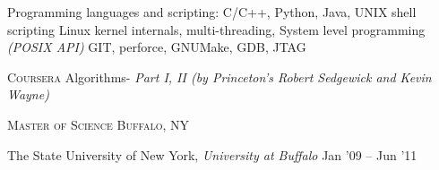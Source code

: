 \documentclass[10pt,a4paper]{article} %
\begin{document}

\inlineheadsection %
{Programming languages and scripting:} {C/C++, Python, Java, UNIX shell scripting}
 {Linux kernel internals, multi-threading, System level programming \textit{(POSIX API)}}
 {GIT, perforce, GNUMake, GDB, JTAG}
{}

%

\spacedhrule{0.5em}{-0.4em} %


\headedsection %
{\textsc{Coursera}} {} {
  \headedsubsection %
  {Algorithms- \textit{Part I, II (by Princeton's Robert Sedgewick and Kevin Wayne)}}
  {} {
	\\
  }\vspace{-1.0em}
}

\headedsection %
{\textsc{Master of Science}}
{\textsc{Buffalo, NY}} {

  \headedsubsection %
	{The State University of New York, \textit{University at Buffalo}} 
	{Jan '09 -- Jun '11} {}
}
\end{document}
